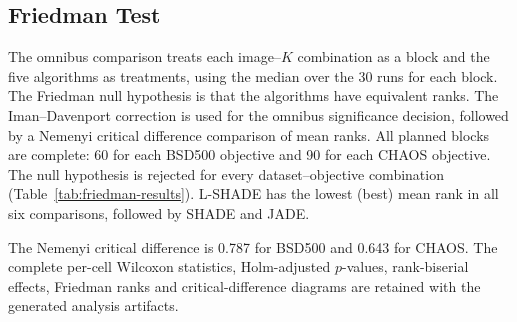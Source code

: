 \documentclass[review]{elsarticle}
\begin{document}
\subsection{Friedman Test}

The omnibus comparison treats each image--$K$ combination as a
block and the five algorithms as treatments, using the median over the
30 runs for each block. The Friedman null hypothesis is that the
algorithms have equivalent ranks. The Iman--Davenport correction is used
for the omnibus significance decision, followed by a Nemenyi critical
difference comparison of mean ranks. All planned blocks are complete:
60 for each BSD500 objective and 90 for each CHAOS objective. The null
hypothesis is rejected for every dataset--objective combination
(Table~\ref{tab:friedman-results}). L-SHADE has the lowest (best) mean
rank in all six comparisons, followed by SHADE and JADE.


\begin{table}[H]
\caption{Friedman tests with Iman--Davenport correction. Rank order is
from best (lowest mean rank) to worst.}
\label{tab:friedman-results}
\centering
\small
{}

\end{table}

The Nemenyi critical difference is 0.787 for BSD500 and 0.643 for
CHAOS. The complete per-cell Wilcoxon statistics, Holm-adjusted
$p$-values, rank-biserial effects, Friedman ranks and critical-difference
diagrams are retained with the generated analysis artifacts.
\end{document}
